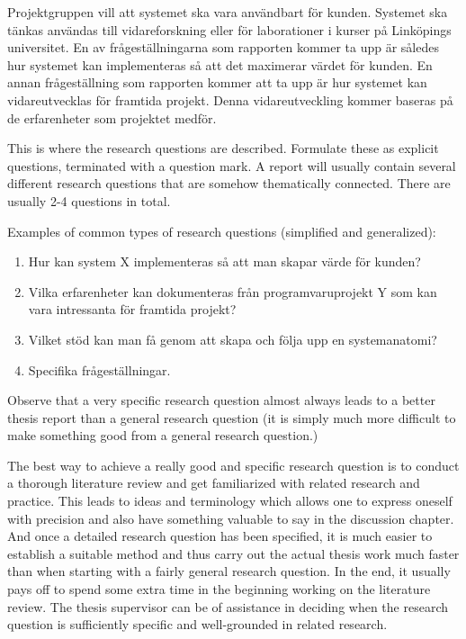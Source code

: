Projektgruppen vill att systemet ska vara användbart för kunden. Systemet ska tänkas användas till vidareforskning eller för laborationer i kurser på Linköpings universitet. En av frågeställningarna som rapporten kommer ta upp är således hur systemet kan implementeras så att det maximerar värdet för kunden. En annan frågeställning som rapporten kommer att ta upp är hur systemet kan vidareutvecklas för framtida projekt. Denna vidareutveckling kommer baseras på de erfarenheter som projektet medför.


This is where the research questions are described.
Formulate these as explicit questions, terminated with a
question mark. A report will usually contain several different
research questions that are somehow thematically connected.
There are usually 2-4 questions in total.

Examples of common types of research questions (simplified
and generalized):

\begin{enumerate}
\item Hur kan system X implementeras så att man skapar värde för kunden?

\item Vilka erfarenheter kan dokumenteras från programvaruprojekt Y som kan vara intressanta för framtida projekt?

\item Vilket stöd kan man få genom att skapa och följa upp en systemanatomi?

\item Specifika frågeställningar.

\end{enumerate}


Observe that a very specific research question almost always
leads to a better thesis report than a general research question
(it is simply much more difficult to make something good
from a general research question.)

The best way to achieve a really good and specific research
question is to conduct a thorough literature review and get
familiarized with related research and practice. This leads to
ideas and terminology which allows one to express oneself
with precision and also have something valuable to say in the
discussion chapter. And once a detailed research question
has been specified, it is much easier to establish a suitable
method and thus carry out the actual thesis work much faster
than when starting with a fairly general research question. In
the end, it usually pays off to spend some extra time in the
beginning working on the literature review. The thesis
supervisor can be of assistance in deciding when the research
question is sufficiently specific and well-grounded in related
research.

